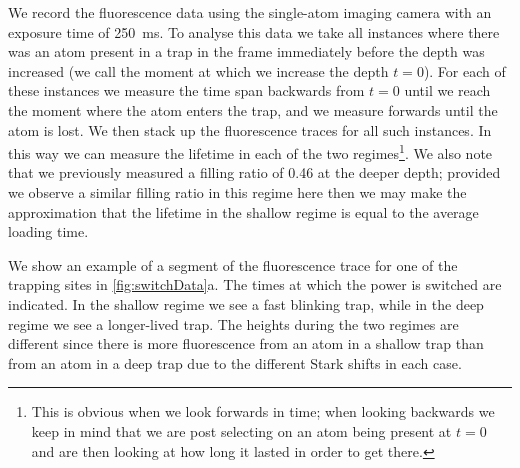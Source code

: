 \documentclass[../Thesis-IJspeert.tex]{subfiles}
\begin{document}
We record the fluorescence data using the single-atom imaging camera with an exposure time of \SI{250}{\ms}. To analyse this data we take all instances where there was an atom present in a trap in the frame immediately before the depth was increased (we call the moment at which we increase the depth $t=0$). For each of these instances we measure the time span backwards from $t=0$ until we reach the moment where the atom enters the trap, and we measure forwards until the atom is lost. We then stack up the fluorescence traces for all such instances. In this way we can measure the lifetime in each of the two regimes\footnote{This is obvious when we look forwards in time; when looking backwards we keep in mind that we are post selecting on an atom being present at $t=0$ and are then looking at how long it lasted in order to get there.}. We also note that we previously measured a filling ratio of \num{0.46} at the deeper depth; provided we observe a similar filling ratio in this regime here then we may make the approximation that the lifetime in the shallow regime is equal to the average loading time. 


We show an example of a segment of the fluorescence trace for one of the trapping sites in \cref{fig:switchData}a. The times at which the power is switched are indicated. In the shallow regime we see a fast blinking trap, while in the deep regime we see a longer-lived trap. The heights during the two regimes are different since there is more fluorescence from an atom in a shallow trap than from an atom in a deep trap due to the different Stark shifts in each case.
\end{document}
